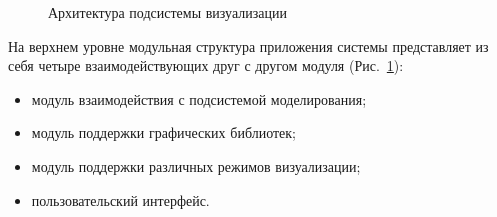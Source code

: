 \documentclass[a4paper,12pt]{extarticle}
\begin{document}
\begin{figure}[h]
    \caption{Архитектура подсистемы визуализации}
    \label{ris:architecture-all}
\end{figure}


На верхнем уровне модульная структура приложения системы представляет из себя четыре взаимодействующих друг с другом модуля (Рис.~\ref{ris:architecture-all}):
\begin{itemize}
    \item модуль взаимодействия с подсистемой моделирования;
    \item модуль поддержки графических библиотек;
    \item модуль поддержки различных режимов визуализации;
    \item пользовательский интерфейс.
\end{itemize}
\end{document}

